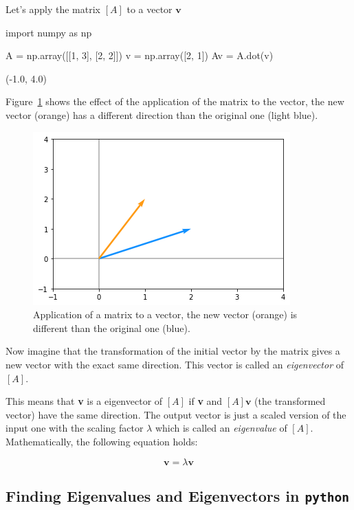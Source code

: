 Let's apply the matrix $[A]$ to a vector $\boldsymbol{v}$

\begin{ipythonnon}
import numpy as np

A = np.array([[1, 3], [2, 2]])	
v = np.array([2, 1])
Av = A.dot(v)
\end{ipythonnon}
\begin{ioutput}
(-1.0, 4.0)
\end{ioutput}

Figure~\ref{fig:matrix_as_transform} shows the effect of the application of the matrix to the vector, the new vector (orange) has a different direction than the original one (light blue).

\begin{figure}[htb]
	\centering
	\includegraphics[width=0.7\linewidth]{figures/matrix_transformation}
	\caption{Application of a matrix to a vector, the new vector (orange) is different than the original one (blue).}
	\label{fig:matrix_as_transform}
\end{figure}

Now imagine that the transformation of the initial vector by the matrix gives a new vector with the exact same direction. This vector is called an \emph{eigenvector} of $[A]$.

This means that \textbf{v} is a eigenvector of $[A]$ if \textbf{v} and $[A]\boldsymbol{v}$ (the transformed vector) have the same direction. The output vector is just a scaled version of the input one with the scaling factor $\lambda$ which is called an \emph{eigenvalue} of $[A]$. Mathematically, the following equation holds:

\begin{equation}
[A]\boldsymbol{v}=\lambda \boldsymbol{v}
\end{equation}

\subsection{Finding Eigenvalues and Eigenvectors in \texttt{python}}
\label{find-eigenvalues-and-eigenvectors-in-python}

